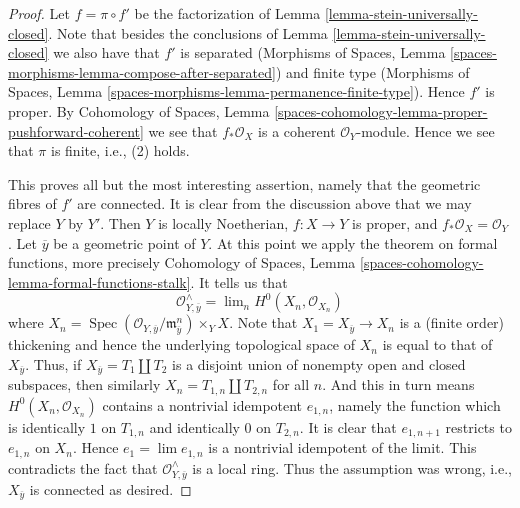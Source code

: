 \documentclass[10pt,a4paper]{amsart}
\theoremstyle{plain}
\theoremstyle{definition}
\theoremstyle{remark}
\numberwithin{equation}{subsection}
\def\lim{\mathop{\mathrm{lim}}\nolimits}
\def\Spec{\mathop{\mathrm{Spec}}}
\begin{document}
\begin{proof}
Let $f = \pi \circ f'$ be the factorization of
Lemma \ref{lemma-stein-universally-closed}. Note that besides the
conclusions of Lemma \ref{lemma-stein-universally-closed} we
also have that $f'$ is separated
(Morphisms of Spaces, Lemma
\ref{spaces-morphisms-lemma-compose-after-separated})
and finite type
(Morphisms of Spaces, Lemma
\ref{spaces-morphisms-lemma-permanence-finite-type}).
Hence $f'$ is proper. By
Cohomology of Spaces, Lemma
\ref{spaces-cohomology-lemma-proper-pushforward-coherent}
we see that $f_*\mathcal{O}_X$ is a coherent $\mathcal{O}_Y$-module.
Hence we see that $\pi$ is finite, i.e., (2) holds.

\medskip\noindent
This proves all but the most interesting assertion, namely that
the geometric fibres of $f'$ are connected. It is clear from the
discussion above that we may replace $Y$ by $Y'$. 
Then $Y$ is locally Noetherian,
$f : X \to Y$ is proper, and $f_*\mathcal{O}_X = \mathcal{O}_Y$.
Let $\overline{y}$ be a geometric point of $Y$.
At this point we apply the theorem on formal functions,
more precisely Cohomology of Spaces, Lemma
\ref{spaces-cohomology-lemma-formal-functions-stalk}.
It tells us that
$$
\mathcal{O}^\wedge_{Y, \overline{y}} =
\lim_n H^0(X_n, \mathcal{O}_{X_n})
$$
where $X_n =
\Spec(\mathcal{O}_{Y, \overline{y}}/\mathfrak m_{\overline{y}}^n) \times_Y X$.
Note that $X_1 = X_{\overline{y}} \to X_n$ is a (finite order) thickening
and hence the underlying topological space of $X_n$ is equal to that
of $X_{\overline{y}}$. Thus, if $X_{\overline{y}} = T_1 \amalg T_2$
is a disjoint union of nonempty open and closed subspaces, then similarly
$X_n = T_{1, n} \amalg T_{2, n}$ for all $n$. And this in turn means
$H^0(X_n, \mathcal{O}_{X_n})$ contains a nontrivial idempotent $e_{1, n}$,
namely the function which is identically $1$ on $T_{1, n}$ and
identically $0$ on $T_{2, n}$. It is clear that $e_{1, n + 1}$
restricts to $e_{1, n}$ on $X_n$. Hence $e_1 = \lim e_{1, n}$
is a nontrivial idempotent of the limit. This contradicts the fact
that $\mathcal{O}^\wedge_{Y, \overline{y}}$ is a local ring. Thus the
assumption was wrong, i.e., $X_{\overline{y}}$ is connected
as desired.
\end{proof}
\end{document}
